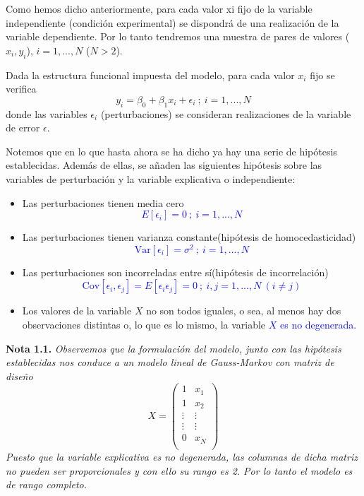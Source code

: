 \documentclass[10pt,a4paper]{book}
\begin{document}
Como hemos dicho anteriormente, para cada valor xi fijo de la variable independiente (condición experimental) se dispondrá de una realización de la variable dependiente. Por lo tanto tendremos una muestra de pares de valores ($x_i,y_i$), $i=1,...,N$ ($N > 2$).

Dada la estructura funcional impuesta del modelo, para cada valor $x_i$ fijo se verifica $$y_i=\beta_0 + \beta_1x_i + \epsilon_i\ ;\ i=1,...,N$$ donde las variables $\epsilon_i$ (perturbaciones) se consideran realizaciones de la variable de error $\epsilon$.

Notemos que en lo que hasta ahora se ha dicho ya hay una serie de hipótesis establecidas. Además de ellas, se añaden las siguientes hipótesis sobre las variables de perturbación y la variable explicativa o independiente:
\begin{itemize}
\item Las perturbaciones tienen media cero \textcolor{blue}{$$E[\epsilon_i]=0\ ;\ i=1,...,N$$}
\item Las perturbaciones tienen varianza constante(hipótesis de homocedasticidad)\textcolor{blue}{$$\mathrm{Var}[\epsilon_i]=\sigma^2\ ;\ i=1,...,N$$}
\item Las perturbaciones son incorreladas entre sí(hipótesis de incorrelación) \textcolor{blue}{$$\mathrm{Cov}[\epsilon_i,\epsilon_j]=E[\epsilon_i\epsilon_j]=0\ ;\ i,j=1,...,N\ (i\neq j)$$}
\item Los valores de la variable $X$ no son todos iguales, o sea, al menos hay dos observaciones distintas o, lo que es lo mismo, la variable \textcolor{blue}{$X$ es no degenerada}.
\end{itemize}

\textbf{Nota 1.1.} \textit{Observemos que la formulación del modelo, junto con las hipótesis establecidas nos conduce a un modelo lineal de Gauss-Markov con matriz de diseño} $$X=\left( \begin{array}{cc}
1 & x_1\\
1 & x_2\\
\vdots & \vdots\\
\vdots & \vdots\\
0 & x_N\\
\end{array} \right)$$
\textit{Puesto que la variable explicativa es no degenerada, las columnas de dicha matriz no pueden ser proporcionales y con ello su rango es 2. Por lo tanto el modelo es de rango completo.}
\ \\
\end{document}
